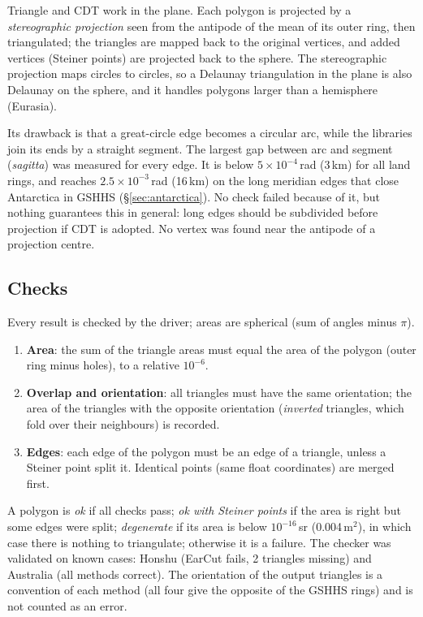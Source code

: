 \documentclass[11pt,a4paper]{article}
\begin{document}
Triangle and CDT work in the plane. Each polygon is projected by a \emph{stereographic projection}
seen from the antipode of the mean of its outer ring, then triangulated; the triangles are mapped
back to the original vertices, and added vertices (Steiner points) are projected back to the
sphere. The stereographic projection maps circles to circles, so a Delaunay triangulation in the
plane is also Delaunay on the sphere, and it handles polygons larger than a hemisphere (Eurasia).

Its drawback is that a great-circle edge becomes a circular arc, while the libraries join its ends
by a straight segment. The largest gap between arc and segment (\emph{sagitta}) was measured for
every edge. It is below $5\times10^{-4}$\,rad (3\,km) for all land rings, and reaches
$2.5\times10^{-3}$\,rad (16\,km) on the long meridian edges that close Antarctica in GSHHS
(\S\ref{sec:antarctica}). No check failed because of it, but nothing guarantees this in general:
long edges should be subdivided before projection if CDT is adopted. No vertex was found near
the antipode of a projection centre.

\subsection{Checks}

Every result is checked by the driver; areas are spherical (sum of angles minus $\pi$).

\begin{enumerate}
\item \textbf{Area}: the sum of the triangle areas must equal the area of the polygon (outer ring
  minus holes), to a relative $10^{-6}$.
\item \textbf{Overlap and orientation}: all triangles must have the same orientation; the area of
  the triangles with the opposite orientation (\emph{inverted} triangles, which fold over their
  neighbours) is recorded.
\item \textbf{Edges}: each edge of the polygon must be an edge of a triangle, unless a Steiner
  point split it. Identical points (same float coordinates) are merged first.
\end{enumerate}

\noindent A polygon is \emph{ok} if all checks pass; \emph{ok with Steiner points} if the area is
right but some edges were split; \emph{degenerate} if its area is below $10^{-16}$\,sr
(0.004\,m$^2$), in which case there is nothing to triangulate; otherwise it is a failure.
The checker was validated on known cases: Honshu (EarCut fails, 2 triangles missing) and
Australia (all methods correct). The orientation of the output triangles is a convention of each
method (all four give the opposite of the GSHHS rings) and is not counted as an error.
\end{document}
